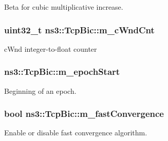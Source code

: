 Beta for cubic multiplicative increase. 

\subsubsection[{\texorpdfstring{m\+\_\+c\+Wnd\+Cnt}{m_cWndCnt}}]{\setlength{\rightskip}{0pt plus 5cm}uint32\+\_\+t ns3\+::\+Tcp\+Bic\+::m\+\_\+c\+Wnd\+Cnt\hspace{0.3cm}{\ttfamily [private]}}\hypertarget{classns3_1_1TcpBic_ae83b19da3bfd61fd85d71f2f6e39a51b}{}\label{classns3_1_1TcpBic_ae83b19da3bfd61fd85d71f2f6e39a51b}


c\+Wnd integer-\/to-\/float counter 

\subsubsection[{\texorpdfstring{m\+\_\+epoch\+Start}{m_epochStart}}]{ ns3\+::\+Tcp\+Bic\+::m\+\_\+epoch\+Start\hspace{0.3cm}{\ttfamily [private]}}\hypertarget{classns3_1_1TcpBic_ae0f10aaccd31702d06dc3fb76450ac38}{}\label{classns3_1_1TcpBic_ae0f10aaccd31702d06dc3fb76450ac38}


Beginning of an epoch. 

\subsubsection[{\texorpdfstring{m\+\_\+fast\+Convergence}{m_fastConvergence}}]{\setlength{\rightskip}{0pt plus 5cm}bool ns3\+::\+Tcp\+Bic\+::m\+\_\+fast\+Convergence\hspace{0.3cm}{\ttfamily [private]}}\hypertarget{classns3_1_1TcpBic_a034d8e16b688a2c58b5d2213aa5c3b7b}{}\label{classns3_1_1TcpBic_a034d8e16b688a2c58b5d2213aa5c3b7b}


Enable or disable fast convergence algorithm. 

